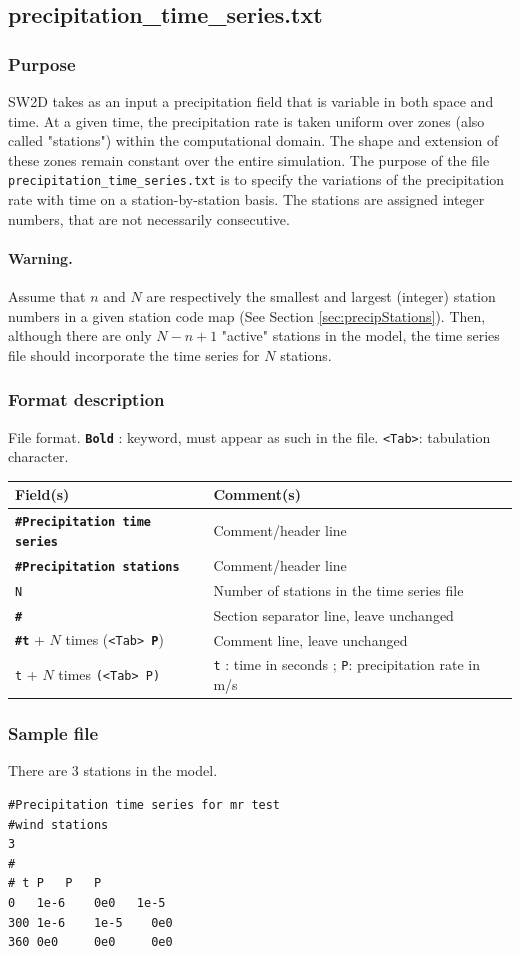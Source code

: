 \subsection{precipitation\_time\_series.txt}

%
\subsubsection{Purpose}
SW2D takes as an input a precipitation field that is variable in both space and time. At a given time, the precipitation rate is taken uniform over zones (also called "stations") within the computational domain. The shape and extension of these zones remain constant over the entire simulation. The purpose of the file \texttt{precipitation\_time\_series.txt} is to specify the variations of the precipitation rate with time on a station-by-station basis. The stations are assigned integer numbers, that are not necessarily consecutive. 
%
\paragraph*{Warning.}
Assume that $n$ and $N$ are respectively the smallest and largest (integer) station numbers in a given station code map (See Section \ref{sec:precipStations}). Then, although there are only $N - n + 1$ "active" stations in the model, the time series file should incorporate the time series for $N$ stations.
%
\subsubsection{Format description}
%
File format.  \texttt{\textbf{Bold}} : keyword, must appear as such in the file. \texttt{<Tab>}: tabulation character. \\
    \begin{tabular}{p{6cm} | p{9cm}}
    \hline
    Field(s) & Comment(s) \\
    \hline  \hline
    \texttt{\textbf{\#Precipitation time series}}  & Comment/header line \\ \hline
    \texttt{\textbf{\#Precipitation stations}}  & Comment/header line \\ \hline
    \texttt{N} & Number of stations in the time series file \\ \hline
    \texttt{\textbf{\#}} & Section separator line, leave unchanged \\  \hline
    \texttt{\textbf{\#t}} + $N$ times (\texttt{<Tab> \textbf{P}}) & Comment line, leave unchanged \\  \hline
    \texttt{t} + $N$ times \texttt{(<Tab> P)} & \texttt{t} : time in seconds ; \texttt{P}: precipitation rate in m/s  \\ \hline
    \end{tabular}
%    
\subsubsection{Sample file}
There are 3 stations in the model.
\begin{verbatim}
#Precipitation time series for mr test
#wind stations
3
#
# t P   P   P
0 	1e-6    0e0   1e-5
300 1e-6    1e-5    0e0
360 0e0     0e0     0e0
\end{verbatim}